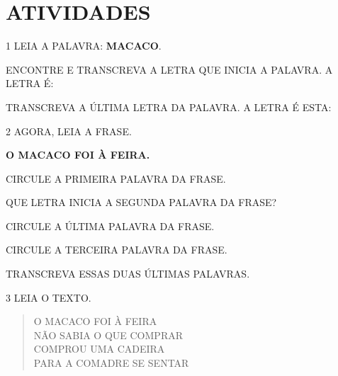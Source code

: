 
\section*{ATIVIDADES}


\num{1} LEIA A PALAVRA: \textbf{MACACO}.
\enlargethispage{2\baselineskip}


\begin{escolha}
\item ENCONTRE E TRANSCREVA A LETRA QUE INICIA A PALAVRA.
A LETRA É:

\item TRANSCREVA A ÚLTIMA LETRA DA PALAVRA. A LETRA É ESTA:
\end{escolha}

\num{2} AGORA, LEIA A FRASE.

\begin{myquote}
\textbf{O MACACO FOI À FEIRA.}
\end{myquote}

\begin{escolha}
\item CIRCULE A PRIMEIRA PALAVRA DA FRASE.

\item QUE LETRA INICIA A SEGUNDA PALAVRA DA FRASE?\\

\item CIRCULE A ÚLTIMA PALAVRA DA FRASE.

\item CIRCULE A TERCEIRA PALAVRA DA FRASE.

\item TRANSCREVA ESSAS DUAS ÚLTIMAS PALAVRAS.\\
\end{escolha}\enlargethispage{5\baselineskip}

\num{3} LEIA O TEXTO.

\begin{myquote}
\begin{verse}
O MACACO FOI À FEIRA\\
NÃO SABIA O QUE COMPRAR\\
COMPROU UMA CADEIRA\\
PARA A COMADRE SE SENTAR
\end{verse}

\end{myquote}

